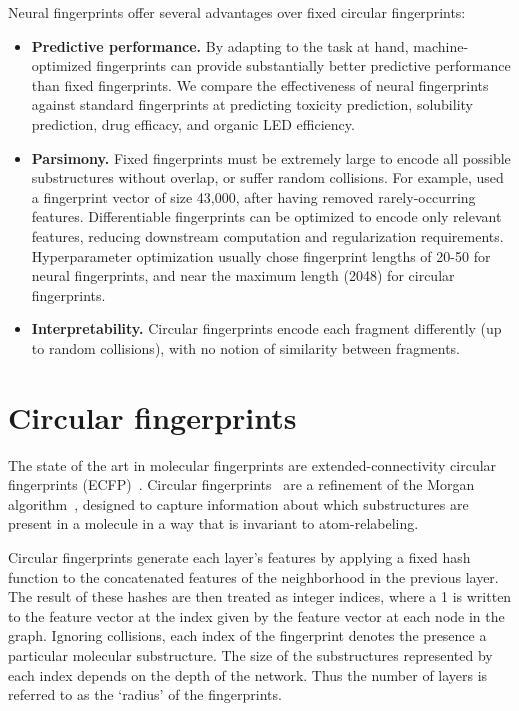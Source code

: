 \documentclass{article}
\begin{document}
Neural fingerprints offer several advantages over fixed circular fingerprints:
\begin{itemize}
\item {\bf Predictive performance.}
By adapting to the task at hand, machine-optimized fingerprints can provide substantially better predictive performance than fixed fingerprints.
We compare the effectiveness of neural fingerprints against standard fingerprints at predicting toxicity prediction, solubility prediction, drug efficacy, and organic LED efficiency.
\item {\bf Parsimony.}
Fixed fingerprints must be extremely large to encode all possible substructures without overlap, or suffer random collisions.
For example, \cite{unterthinerdeep} used a fingerprint vector of size 43,000, after having removed rarely-occurring features.
Differentiable fingerprints can be optimized to encode only relevant features, reducing downstream computation and regularization requirements.
Hyperparameter optimization usually chose fingerprint lengths of 20-50 for neural fingerprints, and near the maximum length (2048) for circular fingerprints.
\item {\bf Interpretability.}
Circular fingerprints encode each fragment differently (up to random collisions), with no notion of similarity between fragments.
\end{itemize}


\section{Circular fingerprints}

The state of the art in molecular fingerprints are extended-connectivity circular fingerprints (ECFP)~\citep{ECFP2010}.
Circular fingerprints~\citep{glem2006circular} are a refinement of the Morgan algorithm~\citep{morgan1965generation}, designed to capture information about which substructures are present in a molecule in a way that is invariant to atom-relabeling.

Circular fingerprints generate each layer's features by applying a fixed hash function to the concatenated features of the neighborhood in the previous layer.
The result of these hashes are then treated as integer indices, where a 1 is written to the feature vector at the index given by the feature vector at each node in the graph.
Ignoring collisions, each index of the fingerprint denotes the presence a particular molecular substructure.
The size of the substructures represented by each index depends on the depth of the network.
Thus the number of layers is referred to as the `radius' of the fingerprints.
\end{document}
